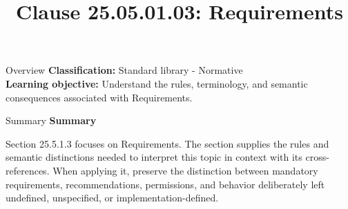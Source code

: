 \documentclass[10pt,letterpaper]{article}
\title{Clause 25.05.01.03: Requirements}
\author{}
\date{}
\begin{document}
\maketitle
\begin{CornellOverviewBox}{Overview}
\textbf{Classification:} Standard library - Normative\\[2pt]
\textbf{Learning objective:} Understand the rules, terminology, and semantic consequences associated with Requirements.
\end{CornellOverviewBox}\begin{CornellSummaryBox}{Summary}
{\sffamily\bfseries\color{Accent} Summary}\par\vspace{3pt}Section 25.5.1.3 focuses on Requirements. The section supplies the rules and semantic distinctions needed to interpret this topic in context with its cross-references. When applying it, preserve the distinction between mandatory requirements, recommendations, permissions, and behavior deliberately left undefined, unspecified, or implementation-defined.
\end{CornellSummaryBox}
\end{document}
